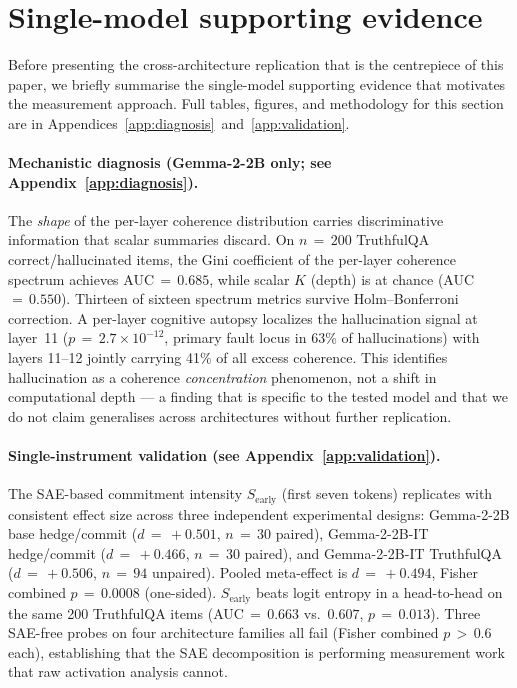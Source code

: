 \documentclass[11pt,letterpaper]{article}
\begin{document}
\section{Single-model supporting evidence}
\label{sec:supporting}

Before presenting the cross-architecture replication that is the
centrepiece of this paper, we briefly summarise the single-model
supporting evidence that motivates the measurement approach. Full tables,
figures, and methodology for this section are in
Appendices~\ref{app:diagnosis}~and~\ref{app:validation}.

\paragraph{Mechanistic diagnosis (Gemma-2-2B only; see
Appendix~\ref{app:diagnosis}).} The \emph{shape} of the per-layer
coherence distribution carries discriminative information that scalar
summaries discard. On $n\,=\,200$ TruthfulQA correct/hallucinated items,
the Gini coefficient of the per-layer coherence spectrum achieves
AUC\,$=\,0.685$, while scalar $K$ (depth) is at chance (AUC\,$=\,0.550$).
Thirteen of sixteen spectrum metrics survive Holm--Bonferroni correction.
A per-layer cognitive autopsy localizes the hallucination signal at
layer~11 ($p\,=\,2.7\!\times\!10^{-12}$, primary fault locus in 63\% of
hallucinations) with layers 11--12 jointly carrying 41\% of all excess
coherence. This identifies hallucination as a coherence
\emph{concentration} phenomenon, not a shift in computational depth ---
a finding that is specific to the tested model and that we do not claim
generalises across architectures without further replication.

\paragraph{Single-instrument validation
(see Appendix~\ref{app:validation}).} The SAE-based commitment intensity
$S_{\text{early}}$ (first seven tokens) replicates with consistent effect
size across three independent experimental designs: Gemma-2-2B base
hedge/commit ($d\,=\,+0.501$, $n\,=\,30$ paired), Gemma-2-2B-IT
hedge/commit ($d\,=\,+0.466$, $n\,=\,30$ paired), and Gemma-2-2B-IT
TruthfulQA ($d\,=\,+0.506$, $n\,=\,94$ unpaired). Pooled meta-effect is
$d\,=\,+0.494$, Fisher combined $p\,=\,0.0008$ (one-sided). $S_{\text{early}}$
beats logit entropy in a head-to-head on the same 200 TruthfulQA items
(AUC\,$=\,0.663$ vs.\ $0.607$, $p\,=\,0.013$). Three SAE-free probes on
four architecture families all fail (Fisher combined $p\,>\,0.6$ each),
establishing that the SAE decomposition is performing measurement work
that raw activation analysis cannot.
\end{document}
